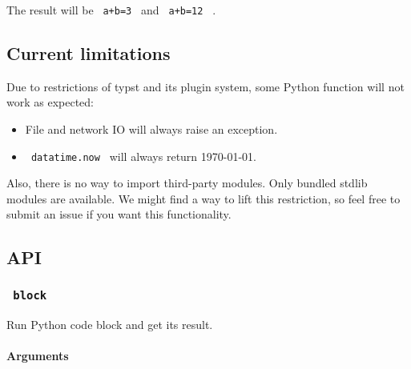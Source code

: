 \begin{Shaded}
\begin{Highlighting}[]
\NormalTok{\textasciigrave{}\textasciigrave{}\textasciigrave{}}


\end{Highlighting}
\end{Shaded}

The result will be \texttt{\ a+b=3\ } and
\texttt{\ a+b=\textquotesingle{}12\textquotesingle{}\ } .

\subsection{Current limitations}\label{current-limitations}

Due to restrictions of typst and its plugin system, some Python function
will not work as expected:

\begin{itemize}
\tightlist
\item
  File and network IO will always raise an exception.
\item
  \texttt{\ datatime.now\ } will always return 1970-01-01.
\end{itemize}

Also, there is no way to import third-party modules. Only bundled stdlib
modules are available. We might find a way to lift this restriction, so
feel free to submit an issue if you want this functionality.

\subsection{API}\label{api}

\subsubsection{\texorpdfstring{\texttt{\ block\ }}{ block }}\label{block}

Run Python code block and get its result.

\paragraph{Arguments}\label{arguments}

